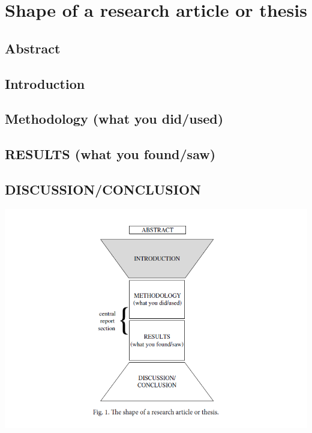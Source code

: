 \chapter{Shape of a research article or thesis}

\section{Abstract}

\section{Introduction}

\section{Methodology (what you did/used)}

\section{RESULTS (what you found/saw)}

\section{DISCUSSION/CONCLUSION}

\begin{center}
	\includegraphics[scale=0.9]{./images/shapeofresartorthesis.png}
\end{center}